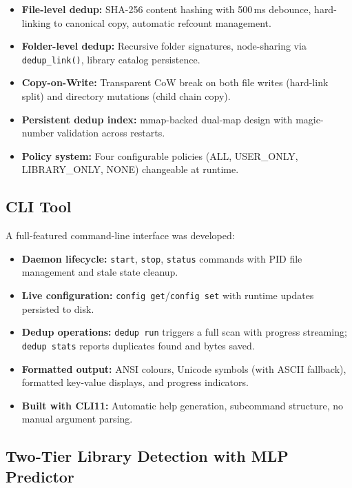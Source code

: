 \documentclass[12pt, a4paper]{article}
\begin{document}
\begin{itemize}
  \item \textbf{File-level dedup:} SHA-256 content hashing with 500\,ms debounce, hard-linking to canonical copy, automatic refcount management.
  \item \textbf{Folder-level dedup:} Recursive folder signatures, node-sharing via \texttt{dedup\_link()}, library catalog persistence.
  \item \textbf{Copy-on-Write:} Transparent CoW break on both file writes (hard-link split) and directory mutations (child chain copy).
  \item \textbf{Persistent dedup index:} mmap-backed dual-map design with magic-number validation across restarts.
  \item \textbf{Policy system:} Four configurable policies (ALL, USER\_ONLY, LIBRARY\_ONLY, NONE) changeable at runtime.
\end{itemize}

\subsection{CLI Tool}

A full-featured command-line interface was developed:

\begin{itemize}
  \item \textbf{Daemon lifecycle:} \texttt{start}, \texttt{stop}, \texttt{status} commands with PID file management and stale state cleanup.
  \item \textbf{Live configuration:} \texttt{config get}/\texttt{config set} with runtime updates persisted to disk.
  \item \textbf{Dedup operations:} \texttt{dedup run} triggers a full scan with progress streaming; \texttt{dedup stats} reports duplicates found and bytes saved.
  \item \textbf{Formatted output:} ANSI colours, Unicode symbols (with ASCII fallback), formatted key-value displays, and progress indicators.
  \item \textbf{Built with CLI11:} Automatic help generation, subcommand structure, no manual argument parsing.
\end{itemize}

\subsection{Two-Tier Library Detection with MLP Predictor}
\end{document}
